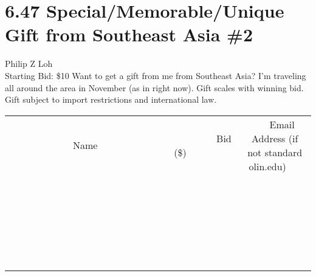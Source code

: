 \documentclass[11pt]{article}
\begin{document}
\section*{6.47 Special/Memorable/Unique Gift from Southeast Asia \#2}
Philip Z Loh
\\
Starting Bid: \$10
\newline
Want to get a gift from me from Southeast Asia? I'm traveling all around the area in November (as in right now). Gift scales with winning bid. Gift subject to import restrictions and international law.
\\[6ex]
\begin{tabular}{c c c}
~~~~~~~~~~~~~Name~~~~~~~~~~~~~ & ~~~~~~~~~Bid (\$)~~~~~~~~~  & ~~~Email Address (if not standard olin.edu)~~~\\
 & & \\
\hline
 & & \\
\hline
 & & \\
\hline
 & & \\
\hline
 & & \\
\hline
 & & \\
\hline
 & & \\
\hline
 & & \\
\hline
 & & \\
\hline
 & & \\
\hline
 & & \\
\hline
 & & \\
\hline
 & & \\
\hline
 & & \\
\hline
 & & \\
\hline
 & & \\
\hline
 & & \\
\hline
 & & \\
\hline
 & & \\
\hline
 & & \\
\hline
 & & \\
\hline
 & & \\
\hline
 & & \\
\hline
 & & \\
\hline
 & & \\
\hline
 & & \\
\hline
\end{tabular}
\newpage
\end{document}
